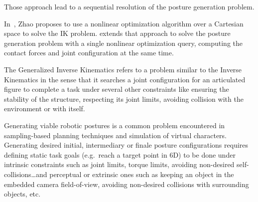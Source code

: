 Those approach lead to a sequential resolution of the posture generation problem.

In~\cite{Zhao1994}, Zhao proposes to use a nonlinear optimization algorithm over a Cartesian space to solve the IK problem.
\cite{bouyarmane2010static} extends that approach to solve the posture generation problem with a single nonlinear optimization query, computing the contact forces and joint configuration at the same time.



The Generalized Inverse Kinematics refers to a problem similar to the Inverse Kinematics in the sense that it searches a joint configuration for an articulated figure to complete a task under several other constraints like ensuring the stability of the structure, respecting its joint limits, avoiding collision with the environment or with itself.

Generating viable robotic postures is a common problem encountered in sampling-based planning techniques and simulation of virtual characters.
Generating desired initial, intermediary or finale posture configurations requires defining static task goals (e.g.\ reach a target point in 6D) to be done under intrinsic constraints such as joint limits, torque limits, avoiding non-desired self-collisions\ldots and perceptual or extrinsic ones such as keeping an object in the embedded camera field-of-view, avoiding non-desired collisions with surrounding objects, etc.


